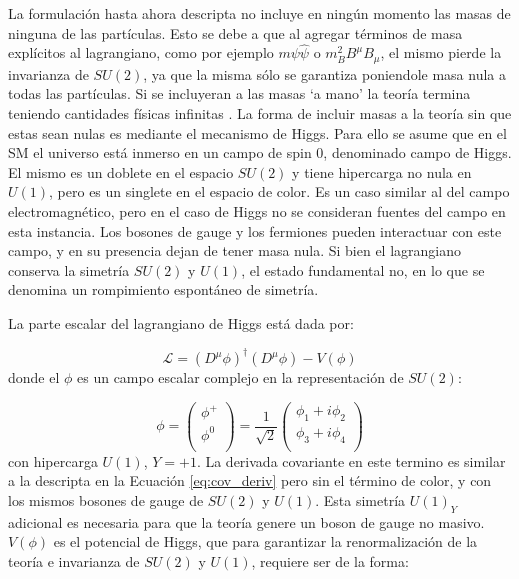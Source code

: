 La formulación hasta ahora descripta no incluye en ningún momento las masas de ninguna de las partículas. Esto se debe a que al agregar términos de masa explícitos al lagrangiano, como por ejemplo $m\psi\hat{\psi}$ o $m_B^2 B^{\mu}B_{\mu}$, el mismo pierde la invarianza de $SU(2)$, ya que la misma sólo se garantiza poniendole masa nula a todas las partículas. Si se incluyeran a las masas `a mano' la teoría termina teniendo cantidades físicas infinitas . La forma de incluir masas a la teoría sin que estas sean nulas es mediante el mecanismo de Higgs. Para ello se asume que en el SM el universo está inmerso en un campo de spin 0, denominado campo de Higgs. El mismo es un doblete en el espacio $SU(2)$ y tiene hipercarga no nula en $U(1)$, pero es un singlete en el espacio de color. Es un caso similar al del campo electromagnético, pero en el caso de Higgs no se consideran fuentes del campo en esta instancia. Los bosones de gauge y los fermiones pueden interactuar con este campo, y en su presencia dejan de tener masa nula. Si bien el lagrangiano conserva la simetría $SU(2)$ y $U(1)$, el estado fundamental no, en lo que se denomina un rompimiento espontáneo de simetría.

La parte escalar del lagrangiano de Higgs está dada por:

\begin{equation}
\mathcal{L} = (D^{\mu}\phi)^{\dagger}(D^{\mu}\phi) - V(\phi)
\end{equation}
%
donde el $\phi$ es un campo escalar complejo en la representación de $SU(2)$:

\begin{equation}
	\phi = 
	\begin{pmatrix}
	\phi^{+} \\
	\phi^{0} \\
	\end{pmatrix} = \frac{1}{\sqrt{2}}
	\begin{pmatrix}
	\phi_{1} + i\phi_{2} \\
	\phi_{3} + i\phi_{4} \\
	\end{pmatrix}
\end{equation}
%
con hipercarga $U(1)$, $Y=+1$. La derivada covariante en este termino es similar a la descripta en la Ecuación \ref{eq:cov_deriv} pero sin el término de color, y con los mismos bosones de gauge de $SU(2)$ y $U(1)$. Esta simetría $U(1)_Y$ adicional es necesaria para que la teoría genere un boson de gauge no masivo.
$V(\phi)$ es el potencial de Higgs, que para garantizar la renormalización de la teoría e invarianza de $SU(2)$ y $U(1)$, requiere ser de la forma:

